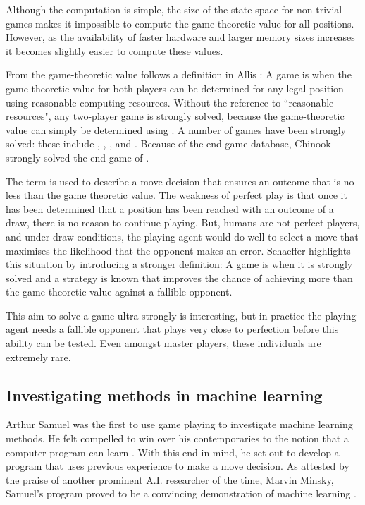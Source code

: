 Although the computation is simple, the size of the state space for non-trivial games makes it impossible to compute the game-theoretic value for all positions.  However, as the availability of faster hardware and larger memory sizes increases it becomes slightly easier to compute these values.  

From the game-theoretic value follows a definition in Allis \cite{allis94}:  A game is  when the game-theoretic value for both players can be determined for any legal position using reasonable computing resources.  Without the reference to ``reasonable resources", any two-player game is strongly solved, because the game-theoretic value can simply be determined using . A number of games have been strongly solved: these include , , ,  and  \cite{vandenherik:games}. Because of the end-game database, Chinook strongly solved the end-game of  \cite{schaeffer:reexamination}.

The term  is used to describe a move decision that ensures an outcome that is no less than the game theoretic value.  The weakness of perfect play is that once it has been determined that a position has been reached with an outcome of a draw, there is no reason to continue playing.  But, humans are not perfect players, and under draw conditions, the playing agent would do well to select a move that maximises the likelihood that the opponent makes an error.  Schaeffer \cite{schaeffer:solving} highlights this situation by introducing a stronger definition: A game is   when it is strongly solved and a strategy is known that improves the chance of achieving more than the game-theoretic value against a fallible opponent.  

This aim to solve a game ultra strongly is interesting, but in practice the playing agent needs a fallible opponent that plays very close to perfection before this ability can be tested.  Even amongst master players, these individuals are extremely rare.  

\subsection{Investigating methods in machine learning}
\label{sec:investigating}
Arthur Samuel was the first to use game playing to investigate machine learning methods. He felt compelled to win over his contemporaries to the notion that a computer program can learn \cite{samuel:checkers}.  With this end in mind, he set out to develop a  program that uses previous experience to make a move decision.  As attested by the praise of another prominent A.I. researcher of the time, Marvin Minsky, Samuel's program proved to be a convincing demonstration of machine learning \cite{minsky:steps}.  


